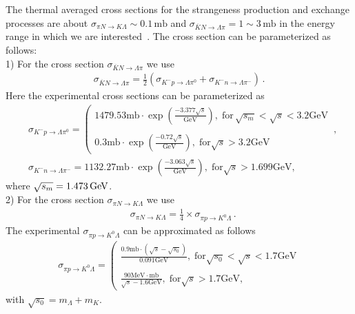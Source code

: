 The thermal averaged cross sections for the strangeness production and exchange processes are about $\sigma_{\pi N\rightarrow K\Lambda}\sim0.1\,\mathrm{mb}$ and $\sigma_{\overline{K}N\rightarrow \Lambda\pi}=1\sim3\,\mathrm{mb}$ in the energy range in which we are interested~\cite{Koch:1986ud}. The cross section can be parameterized as follows:\\
1) For the cross section $\sigma_{\overline{K}N\rightarrow \Lambda\pi}$ we use~\cite{Koch:1986ud}
 \begin{align}
 \sigma_{\overline{K}N\rightarrow \Lambda\pi}=\frac{1}{2}\left(\sigma_{K^-p\rightarrow \Lambda\pi^0}+\sigma_{K^-n\rightarrow \Lambda\pi^-}\right)\,.
\end{align}
Here the experimental cross sections can be parameterized as 
\begin{align}
&\sigma_{K^-p\rightarrow \Lambda\pi^0}\!\!=\!\!\left(\begin{array}{l}\!\!1479.53\mathrm{mb}\!\cdot\!\exp{\left(\frac{-3.377\sqrt{s}}{\mathrm{GeV}}\right)},\; \mathrm{for}\,\sqrt{s_m}\!\!<\!\!\sqrt{s}\!<\!3.2\mathrm{GeV} \\ \\0.3\mathrm{mb}\!\cdot\!\exp{\left(\frac{-0.72\sqrt{s}}{\mathrm{GeV}}\right)},\; \mathrm{for}\sqrt{s}>3.2\mathrm{GeV}\end{array}\right.\,,
\\
&\sigma_{K^-n\rightarrow \Lambda\pi^-}\!\!=\!\!1132.27\mathrm{mb}\!\cdot\!\exp{\left(\frac{-3.063\sqrt{s}}{\mathrm{GeV}}\right)},\; \mathrm{for}\sqrt{s}>1.699\mathrm{GeV},
\end{align}
where $\sqrt{s_m}=1.473\text{\,GeV}$.\\
2) For the cross section $\sigma_{\pi N\rightarrow K\Lambda}$ we use~\cite{Cugnon:1984pm}
\begin{align}
&\sigma_{\pi N\rightarrow K\Lambda}=\frac{1}{4}\times\sigma_{\pi p\rightarrow K^0\Lambda}\,.
\end{align}
The experimental $\sigma_{\pi p\rightarrow K^0\Lambda}$ can be approximated as follows
\begin{align}
\sigma_{\pi p\rightarrow K^0\Lambda}=\left(\begin{array}{l}\frac{0.9\mathrm{mb}\cdot\left(\sqrt{s}-\sqrt{s_0}\right)}{0.091\mathrm{GeV}},\; \mathrm{for} \sqrt{s_0}<\sqrt{s}<1.7\mathrm{GeV} \\ \\ \frac{90\mathrm{MeV\cdot mb}}{\sqrt{s}-1.6\mathrm{GeV}},\; \mathrm{for}\sqrt{s}>1.7\mathrm{GeV},\end{array}\right.
 \end{align}
 with $ \sqrt{s_0}=m_\Lambda+m_K$. 

